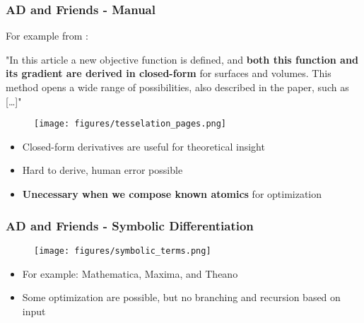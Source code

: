 \documentclass[11pt]{beamer}
\begin{document}
\begin{frame}
	\frametitle{AD and Friends - Manual}


	For example from \cite{tesselation}:

	\begin{center}
		\small
		"In this article a new objective function is defined, and \textbf{both this function and its gradient are derived in closed-form} for surfaces and volumes. This method opens a wide range of possibilities, also described in the paper, such as [\dots]"
	\end{center}

	\begin{figure}
		\texttt{[image: figures/tesselation\_pages.png]}
	\end{figure}

	\begin{itemize}
		\item Closed-form derivatives are useful for theoretical insight
		\item Hard to derive, human error possible
		\item \textbf{Unecessary when we compose known atomics} for optimization
	\end{itemize}
\end{frame}

\begin{frame}
	\frametitle{AD and Friends - Symbolic Differentiation}

	\begin{figure}
		\texttt{[image: figures/symbolic\_terms.png]}
	\end{figure}

	\begin{itemize}
		\item For example: Mathematica, Maxima, and Theano
		\item Some optimization are possible, but no branching and recursion based on input
	\end{itemize}
\end{frame}
\end{document}
